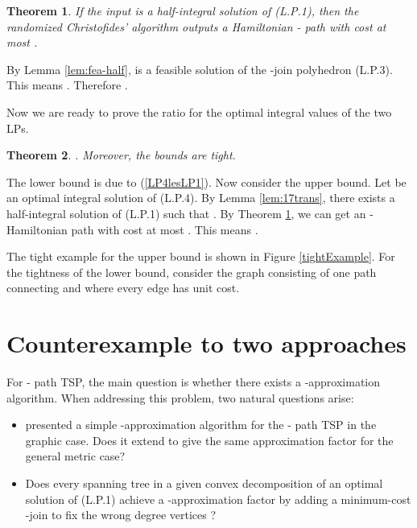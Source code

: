 \documentclass[11pt]{article}
\newcommand{\qed}{\hspace*{\fill}}
\newtheorem{theorem}{Theorem}[section]
\newenvironment{proof}[1][Proof. ]{\noindent {\bf #1 }}{\qed}
\begin{document}
\begin{theorem}\label{halfAlgorithm}
If the input is a half-integral solution  of (L.P.1), then the
randomized Christofides' algorithm outputs a Hamiltonian -
path with cost at most .
\end{theorem}
\begin{proof}
By Lemma \ref{lem:fea-half},  is a feasible solution
of the -join polyhedron (L.P.3).
This means .
Therefore .
\end{proof}

\medskip

Now we are ready to prove the ratio for the optimal integral values
of the two LPs.

\begin{theorem}\label{equivLP41}
.
Moreover, the bounds are tight.
\end{theorem}
\begin{proof}
The lower bound is due to (\ref{LP4lesLP1}). Now consider the upper
bound.  Let  be an optimal integral solution of (L.P.4). By
Lemma \ref{lem:17trans}, there exists a half-integral solution 
of (L.P.1) such that . By Theorem \ref{halfAlgorithm},
we can get an - Hamiltonian path with cost at most .
This means .

The tight example for the upper bound is shown in Figure
\ref{tightExample}. For the tightness of the lower bound, consider
the graph  consisting of one path connecting  and  where
every edge has unit cost.
\end{proof}




\section{Counterexample to two approaches}\label{sec:BI}
For - path TSP, the main question is whether there exists a -approximation algorithm. When addressing this problem, two natural questions arise:

\begin{itemize}
\item \cite{Gao13} presented a simple -approximation algorithm for the - path TSP in the graphic case. Does it extend to give the same approximation factor for the general metric case?
\item Does every spanning tree in a given convex decomposition of an optimal solution  of (L.P.1) achieve a -approximation factor by adding a minimum-cost -join to fix the wrong degree vertices ?
\end{itemize}
\end{document}
